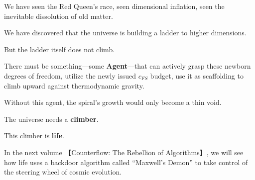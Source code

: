 We have seen the Red Queen's race, seen dimensional inflation, seen the inevitable dissolution of old matter.

We have discovered that the universe is building a ladder to higher dimensions.

But the ladder itself does not climb.

There must be something---some \textbf{Agent}---that can actively grasp these newborn degrees of freedom, utilize the newly issued $c_{FS}$ budget, use it as scaffolding to climb upward against thermodynamic gravity.

Without this agent, the spiral's growth would only become a thin void.

The universe needs a \textbf{climber}.

This climber is \textbf{life}.

In the next volume 【Counterflow: The Rebellion of Algorithms】, we will see how life uses a backdoor algorithm called ``Maxwell's Demon'' to take control of the steering wheel of cosmic evolution.

